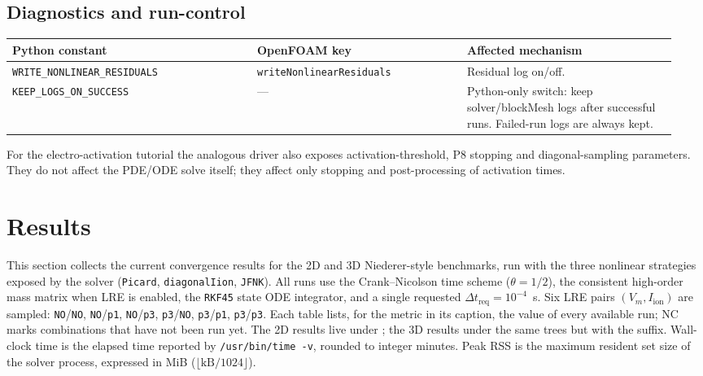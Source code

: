 \documentclass[11pt,a4paper]{article}
\newcommand{\Vm}{V_{m}}
\newcommand{\Iion}{I_{\text{ion}}}
\newcommand{\code}[1]{\texttt{\small #1}}
\begin{document}
\subsection{Diagnostics and run-control}
\begin{longtable}{@{}p{0.35\linewidth}p{0.30\linewidth}p{0.30\linewidth}@{}}
\toprule
Python constant & OpenFOAM key & Affected mechanism \\
\midrule \endhead
\code{WRITE\_NONLINEAR\_RESIDUALS} &
   \code{writeNonlinearResiduals} & Residual log on/off. \\
\code{KEEP\_LOGS\_ON\_SUCCESS} & --- &
   Python-only switch: keep solver/blockMesh logs after successful runs.
   Failed-run logs are always kept. \\
\bottomrule
\end{longtable}

For the electro-activation tutorial the analogous driver also exposes
activation-threshold, P8 stopping and diagonal-sampling parameters. They
do not affect the PDE/ODE solve itself; they affect only stopping and
post-processing of activation times.

\section{Results}
\label{sec:results}

This section collects the current convergence results for the 2D and
3D Niederer-style benchmarks, run with the three nonlinear strategies
exposed by the solver (\code{Picard}, \code{diagonalIion}, \code{JFNK}).
All runs use the Crank--Nicolson time scheme ($\theta = 1/2$), the
consistent high-order mass matrix when LRE is enabled, the
\code{RKF45} state ODE integrator, and a single requested
$\Delta t_{\text{req}} = 10^{-4}$~s. Six LRE pairs $(\Vm,\Iion)$ are
sampled: \code{NO}/\code{NO}, \code{NO}/\code{p1}, \code{NO}/\code{p3},
\code{p3}/\code{NO}, \code{p3}/\code{p1}, \code{p3}/\code{p3}. Each
table lists, for the metric in its caption, the value of every
available run; \textsc{NC} marks combinations that have not been run
yet. The 2D results live under
;
the 3D results under the same trees but with the  suffix.
Wall-clock time is the elapsed time reported by
\texttt{/usr/bin/time -v}, rounded to integer minutes. Peak RSS is
the maximum resident set size of the solver process, expressed in
MiB ($\lfloor\text{kB}/1024\rfloor$).
\end{document}
